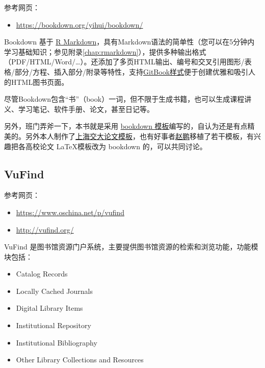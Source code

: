 \documentclass[doctor,openright,twoside]{sjtuthesis}
\providecommand{\tightlist}{%
    \setlength{\itemsep}{0pt}\setlength{\parskip}{0pt}}
\theoremstyle{plain}
\theoremstyle{definition}
\theoremstyle{remark}
\theoremstyle{ocrenumbox}
\theoremstyle{plain}
\begin{document}
参考网页：

\begin{itemize}
\tightlist
\item
  \url{https://bookdown.org/yihui/bookdown/}
\end{itemize}

Bookdown 基于 \href{http://rmarkdown.rstudio.com}{R Markdown}，具有Markdown语法的简单性（您可以在5分钟内学习基础知识；参见附录\ref{chap:rmarkdown}），提供多种输出格式（PDF/HTML/Word/\ldots）。还添加了多页HTML输出、编号和交叉引用图形/表格/部分/方程、插入部分/附录等特性，支持\href{https://www.gitbook.com}{GitBook样式}便于创建优雅和吸引人的HTML图书页面。

尽管Bookdown包含``书''（book）一词，但不限于生成书籍，也可以生成课程讲义、学习笔记、软件手册、论文，甚至日记等。

另外，班门弄斧一下，本书就是采用 \href{https://github.com/bubifengyun/deepin-bible}{bookdown 模板}编写的，自认为还是有点精美的。另外本人制作了\href{https://github.com/bubifengyun/SJTUThesis-Rmd}{上海交大论文模板}，也有好事者\href{https://github.com/pzhaonet/bookdownplus}{赵鹏}移植了若干模板，有兴趣把各高校论文 \LaTeX 模板改为 bookdown 的，可以共同讨论。

\hypertarget{vufind}{%
\subsection{VuFind}\label{vufind}}

参考网页：

\begin{itemize}
\tightlist
\item
  \url{https://www.oschina.net/p/vufind}
\item
  \url{http://vufind.org/}
\end{itemize}

VuFind 是图书馆资源门户系统，主要提供图书馆资源的检索和浏览功能，功能模块包括：

\begin{itemize}
\tightlist
\item
  Catalog Records
\item
  Locally Cached Journals
\item
  Digital Library Items
\item
  Institutional Repository
\item
  Institutional Bibliography
\item
  Other Library Collections and Resources
\end{itemize}
\end{document}
